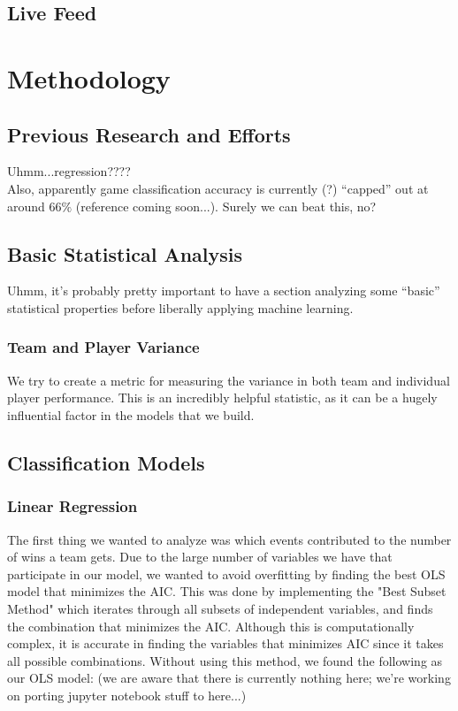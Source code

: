 \documentclass{notes}
\begin{document}
    \subsection{Live Feed}


  \section{Methodology}
    \subsection{Previous Research and Efforts}
      Uhmm...regression????\\

      Also, apparently game classification accuracy is currently (?) ``capped'' out at around $66\%$ (reference coming soon...).
      Surely we can beat this, no?

    \subsection{Basic Statistical Analysis}
      Uhmm, it's probably pretty important to have a section analyzing some ``basic'' statistical properties before liberally applying machine learning.

      \subsubsection{Team and Player Variance}
        We try to create a metric for measuring the variance in both team and individual player performance.
        This is an incredibly helpful statistic, as it can be a hugely influential factor in the models that we build.

    \subsection{Classification Models}

      \subsubsection{Linear Regression}
      The first thing we wanted to analyze was which events contributed to the number of wins a team gets.
      Due to the large number of variables we have that participate in our model, we wanted to avoid overfitting by finding the best OLS model that minimizes the AIC.
      This was done by implementing the "Best Subset Method" which iterates through all subsets of independent variables, and finds the combination that minimizes the AIC.
      Although this is computationally complex, it is accurate in finding the variables that minimizes AIC since it takes all possible combinations.
      Without using this method, we found the following as our OLS model: (we are aware that there is currently nothing here; we're working on porting jupyter notebook stuff to here...)\\
\end{document}
